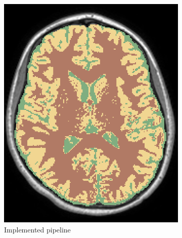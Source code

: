 \documentclass{standalone}
\begin{document}
\begin{figure}[H]
\begin{subfigure}[b]{0.325\textwidth}
             \includegraphics[scale=0.213]{img/Chap3/SEG48.png}
             \caption{Implemented pipeline}
        \end{subfigure}
        \hfill
        \begin{subfigure}[b]{0.325\textwidth}

\end{subfigure}
\end{figure}
\end{document}
